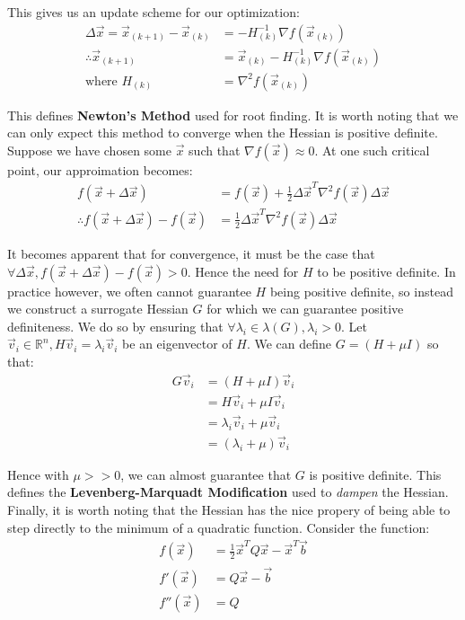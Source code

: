 \documentclass[paper=a4, fontsize=12pt]{scrartcl} %
\numberwithin{equation}{section} %
\numberwithin{figure}{section} %
\numberwithin{table}{section} %
\begin{document}
This gives us an update scheme for our optimization:
\begin{align*}
    \Delta \vec{x} = \vec{x}_{(k+1)} - \vec{x}_{(k)} &= - H^{-1}_{(k)} \nabla f(\vec{x}_{(k)}) \\
    \therefore \vec{x}_{(k+1)} &= \vec{x}_{(k)} - H^{-1}_{(k)} \nabla f(\vec{x}_{(k)}) \\
    \text{where } H_{(k)} &= \nabla^2 f(\vec{x}_{(k)})
\end{align*}

This defines \textbf{Newton's Method} used for root finding. It is worth noting that we can only expect this method to converge when the Hessian 
is positive definite. Suppose we have chosen some $\vec{x}$ such that $\nabla f(\vec{x}) \approx 0$. At one such critical point, our approimation becomes:
\begin{align*}
    f(\vec{x} + \Delta \vec{x}) &= f(\vec{x}) + \frac{1}{2} \Delta \vec{x}^T \nabla^2 f(\vec{x}) \Delta \vec{x} \\
    \therefore f(\vec{x} + \Delta \vec{x}) - f(\vec{x}) &= \frac{1}{2} \Delta \vec{x}^T \nabla^2 f(\vec{x}) \Delta \vec{x}
\end{align*}

It becomes apparent that for convergence, it must be the case that $\forall \Delta \vec{x}, f(\vec{x} + \Delta \vec{x}) - f(\vec{x}) > 0$. Hence the need for $H$ to be positive definite.
In practice however, we often cannot guarantee $H$ being positive definite, so instead we construct a surrogate Hessian $G$ for which we can guarantee positive definiteness. We 
do so by ensuring that $\forall \lambda_i \in \lambda(G), \lambda_i > 0$. Let $\vec{v}_i \in \mathbb{R}^n, H\vec{v}_i = \lambda_i \vec{v}_i$ be 
an eigenvector of $H$. We can define $G = (H + \mu I)$ so that:
\begin{align*}
    G\vec{v}_i &= (H + \mu I)\vec{v}_i \\
    &= H\vec{v}_i + \mu I \vec{v}_i \\
    &= \lambda_i \vec{v}_i + \mu \vec{v}_i \\
    &= (\lambda_i + \mu) \vec{v}_i
\end{align*}

Hence with $\mu >> 0$, we can almost guarantee that $G$ is positive definite. This defines the \textbf{Levenberg-Marquadt Modification} used to \textit{dampen} the Hessian. Finally, 
it is worth noting that the Hessian has the nice propery of being able to step directly to the minimum of a quadratic function. Consider the function:
\begin{align*}
    f(\vec{x}) &= \frac{1}{2} \vec{x}^T Q \vec{x} - \vec{x}^T \vec{b} \\
    f'(\vec{x}) &= Q \vec{x} - \vec{b} \\
    f''(\vec{x}) &= Q
\end{align*}
\end{document}
